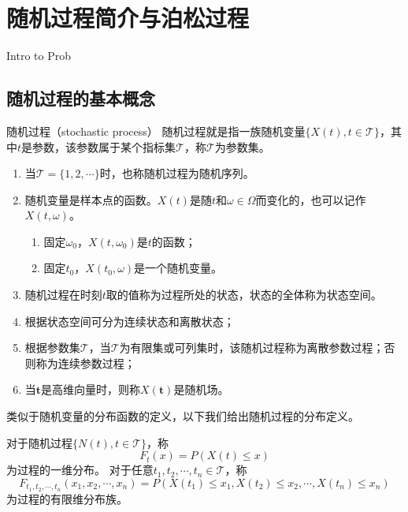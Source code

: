 \chapter{随机过程简介与泊松过程}

\begin{introduction}
    \item Intro to Prob 
\end{introduction}
\section{随机过程的基本概念}
\begin{definition}{随机过程（stochastic process）}
    随机过程就是指一族随机变量$\{X(t),t\in \mathcal{T}\}$，其中$t$是参数，该参数属于某个指标集$\mathcal{T}$，称$\mathcal{T}$为参数集。
\end{definition}
\begin{remark}
    \begin{enumerate}
        \item 当$\mathcal{T} = \{1,2,\cdots\}$时，也称随机过程为随机序列。
        \item 随机变量是样本点的函数。$X(t)$是随$t$和$\omega \in \Omega$而变化的，也可以记作$X(t,\omega)$。
              \begin{enumerate}
                  \item 固定$\omega_0$，$X(t,\omega_0)$是$t$的函数；
                  \item 固定$t_0$，$X(t_0,\omega)$是一个随机变量。
              \end{enumerate}
        \item 随机过程在时刻$t$取的值称为过程所处的状态，状态的全体称为状态空间。
        \item 根据状态空间可分为连续状态和离散状态；
        \item 根据参数集$\mathcal{T}$，当$\mathcal{T}$为有限集或可列集时，该随机过程称为离散参数过程；否则称为连续参数过程；
        \item 当$\bm{t}$是高维向量时，则称$X(\bm{t})$是随机场。
    \end{enumerate}
\end{remark}
类似于随机变量的分布函数的定义，以下我们给出随机过程的分布定义。
\begin{definition}
    对于随机过程$\{N(t),t\in \mathcal{T}\}$，称
    $$
        F_t(x) = P(X(t)\leq x)
    $$
    为过程的一维分布。
    对于任意$t_1,t_2,\cdots,t_n \in \mathcal{T}$，称
    $$
        F_{t_1,t_2,\cdots,t_n}(x_1,x_2,\cdots,x_n) = P(X(t_1)\leq x_1,X(t_2)\leq x_2,\cdots,X(t_n)\leq x_n)
    $$
    为过程的有限维分布族。

\end{definition}
